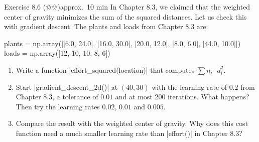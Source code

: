\documentclass[paper=a4, fontsize=11pt, parskip=half]{scrartcl}
\begin{document}
\clearpage
\begin{aufgabe}{Exercise 8.6 (✩✩)}{approx.\ 10 min}
In Chapter 8.3, we claimed that the weighted center of gravity minimizes the sum of the squared distances. Let us check this with gradient descent. The plants and loads from Chapter 8.3 are:

\begin{code}
plants = np.array([[6.0, 24.0], [16.0, 30.0], [20.0, 12.0],
                   [8.0, 6.0], [44.0, 10.0]])
loads = np.array([12, 10, 10, 8, 6])
\end{code}

\begin{enumerate}
  \item Write a function \py|effort_squared(location)| that computes $\sum n_i \cdot d_i^2$.
  \item Start \py|gradient_descent_2d()| at $(40, 30)$ with the learning rate of $0.2$ from Chapter 8.3, a tolerance of $0.01$ and at most 200 iterations. What happens? Then try the learning rates $0.02$, $0.01$ and $0.005$.
  \item Compare the result with the weighted center of gravity. Why does this cost function need a much smaller learning rate than \py|effort()| in Chapter 8.3?
\end{enumerate}

\end{aufgabe}
\end{document}
